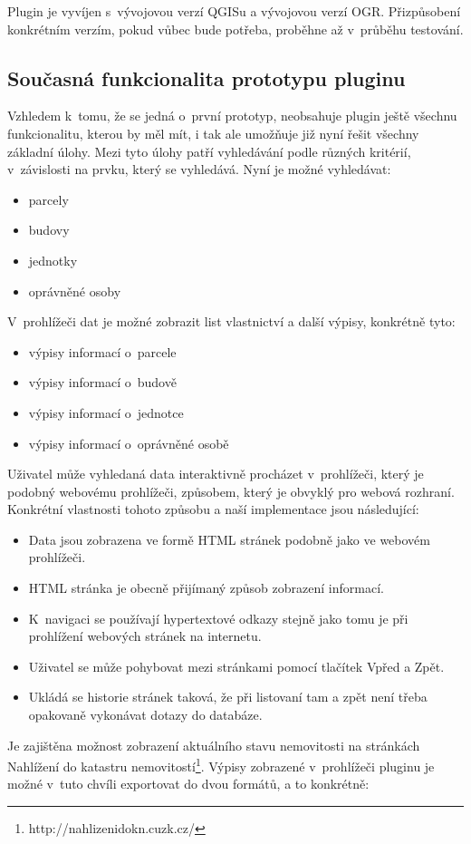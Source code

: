 \documentclass[a4paper,10pt]{article}
\begin{document}
Plugin je vyvíjen s~vývojovou verzí QGISu a vývojovou verzí OGR.
Přizpůsobení konkrétním verzím, pokud vůbec bude potřeba, proběhne až v~průběhu testování.

\subsection{Současná funkcionalita prototypu pluginu}
Vzhledem k~tomu, že se jedná o~první prototyp, neobsahuje plugin ještě všechnu funkcionalitu, kterou by měl mít,
i tak ale umožňuje již nyní řešit všechny základní úlohy.
Mezi tyto úlohy patří vyhledávání podle různých kritérií, v~závislosti na prvku, který se vyhledává.
Nyní je možné vyhledávat:
\begin{itemize}
    \item parcely
    \item budovy
    \item jednotky
    \item oprávněné osoby
\end{itemize}
V~prohlížeči dat je možné zobrazit list vlastnictví a další výpisy, konkrétně tyto:
    
\begin{itemize}
        \item výpisy informací o~parcele
        \item výpisy informací o~budově
        \item výpisy informací o~jednotce
        \item výpisy informací o~oprávněné osobě
\end{itemize}
Uživatel může vyhledaná data interaktivně procházet v~prohlížeči, který je podobný webovému prohlížeči,
způsobem, který je obvyklý pro webová rozhraní.
Konkrétní vlastnosti tohoto způsobu a naší implementace jsou následující:
\begin{itemize}
\item Data jsou zobrazena ve formě HTML stránek podobně jako ve webovém prohlížeči.
\item HTML stránka je obecně přijímaný způsob zobrazení informací.
\item K~navigaci se používají hypertextové odkazy stejně jako tomu je při prohlížení webových stránek na internetu.
\item Uživatel se může pohybovat mezi stránkami pomocí tlačítek Vpřed a Zpět.
\item Ukládá se historie stránek taková, že při listovaní tam a zpět není třeba opakovaně vykonávat dotazy do databáze.
\end{itemize}
Je zajištěna možnost zobrazení aktuálního stavu nemovitosti na stránkách Nahlížení do katastru nemovitostí\footnote{http://nahlizenidokn.cuzk.cz/}.
Výpisy zobrazené v~prohlížeči pluginu je možné v~tuto chvíli exportovat do dvou formátů, a to konkrétně:
\end{document}
